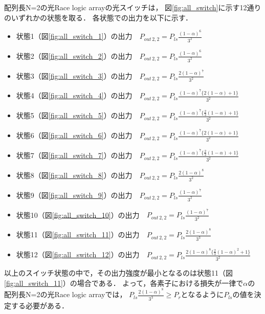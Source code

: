 配列長N=2の光Race logic arrayの光スイッチは，
図\ref{fig:all_switch}に示す12通りのいずれかの状態を取る．
各状態での出力を以下に示す．
\begin{itemize}
\item 状態1（図\ref{fig:all_switch_1}）の出力　$P_{out\,2,2}=P_{ls}\frac{(1-\alpha)^6}{3^2}$\\
\item 状態2（図\ref{fig:all_switch_2}）の出力　$P_{out\,2,2}=P_{ls}\frac{(1-\alpha)^6}{3^2}$\\
\item 状態3（図\ref{fig:all_switch_3}）の出力　$P_{out\,2,2}=P_{ls}\frac{2(1-\alpha)^7}{3^2}$\\
\item 状態4（図\ref{fig:all_switch_4}）の出力　$P_{out\,2,2}=P_{ls}\frac{(1-\alpha)^7\bigl\{2(1-\alpha)+1\bigl\}}{3^2}$\\
\item 状態5（図\ref{fig:all_switch_5}）の出力　$P_{out\,2,2}=P_{ls}\frac{(1-\alpha)^7\bigl\{\frac{2}{3}(1-\alpha)+1\bigl\}}{3^2}$\\
\item 状態6（図\ref{fig:all_switch_6}）の出力　$P_{out\,2,2}=P_{ls}\frac{(1-\alpha)^7\bigl\{2(1-\alpha)+1\bigl\}}{3^2}$\\
\item 状態7（図\ref{fig:all_switch_7}）の出力　$P_{out\,2,2}=P_{ls}\frac{(1-\alpha)^7\bigl\{\frac{2}{3}(1-\alpha)+1\bigl\}}{3^2}$\\
\item 状態8（図\ref{fig:all_switch_8}）の出力　$P_{out\,2,2}=P_{ls}\frac{2(1-\alpha)^8}{3^2}$\\
\item 状態9（図\ref{fig:all_switch_9}）の出力　$P_{out\,2,2}=P_{ls}\frac{(1-\alpha)^7}{3^2}$\\
\item 状態10（図\ref{fig:all_switch_10}）の出力　$P_{out\,2,2}=P_{ls}\frac{(1-\alpha)^7}{3^2}$\\
\item 状態11（図\ref{fig:all_switch_11}）の出力　$P_{out\,2,2}=P_{ls}\frac{2(1-\alpha)^8}{3^3}$\\
\item 状態12（図\ref{fig:all_switch_12}）の出力　$P_{out\,2,2}=P_{ls}\frac{2(1-\alpha)^8\bigl\{\frac{2}{3}(1-\alpha)^2+1\bigl\}}{3^2}$\\
\end{itemize}

以上のスイッチ状態の中で，その出力強度が最小となるのは状態11（図\ref{fig:all_switch_11}）の場合である．
よって，各素子における損失が一律で$\alpha$の
配列長N=2の光Race logic arrayでは，
$P_{ls}\frac{2(1-\alpha)^8}{3^3} \geq P_{r}$となるように$P_{ls}$の値を決定する必要がある．

